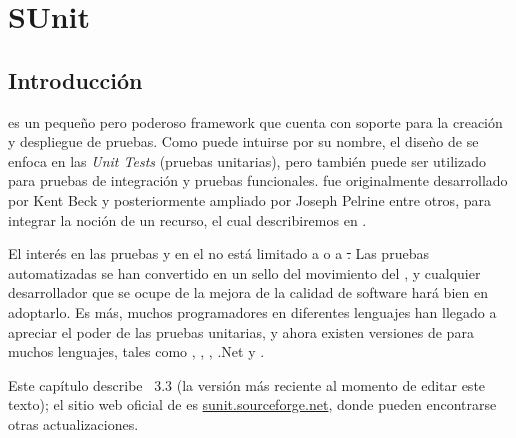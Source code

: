 \documentclass[a4paper,10pt,twoside]{book}
\begin{document}
	\sloppy
\fi
\chapter{SUnit}

\section{Introducci\'on} 


 es un peque\~no pero poderoso framework que cuenta con soporte para la creaci\'on y despliegue de pruebas.
Como puede intuirse por su nombre, el dise\`no de \sunit se enfoca en las \emph{Unit Tests} (pruebas unitarias), 
pero tambi\'en puede ser utilizado para pruebas de integraci\'on y pruebas funcionales.
\sunit fue originalmente desarrollado por Kent Beck y posteriormente ampliado por Joseph
Pelrine entre otros, para integrar la noci\'on de un recurso,
el cual describiremos en .

El inter\'es en las pruebas y en el 
no est\'a limitado a \pharo o a \st.  
Las pruebas automatizadas se han convertido en un sello del movimiento del ,
y cualquier desarrollador que se ocupe de la mejora de la calidad de software har\'a bien en adoptarlo.
Es m\'as, muchos programadores en diferentes lenguajes han llegado a apreciar el poder
de las pruebas unitarias, y ahora existen versiones de 
\xUnit{}  para muchos lenguajes, tales como , , , .Net y .

Este cap\'itulo describe \SUnit~3.3 (la versi\'on m\'as reciente al momento de editar este texto); el sitio web oficial de \sunit es \url{sunit.sourceforge.net}, donde pueden encontrarse otras actualizaciones.
\end{document}
